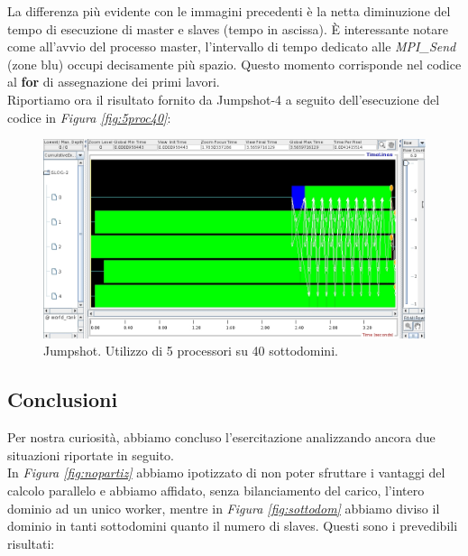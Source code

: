 
La differenza pi\`u evidente con le immagini precedenti \`e la netta diminuzione del tempo di esecuzione di master e slaves (tempo in ascissa).  \`E interessante notare come all'avvio del processo master, l'intervallo di tempo dedicato alle \emph{MPI\_Send} (zone blu) occupi decisamente pi\`u spazio. Questo momento corrisponde nel codice al \textbf{for} di assegnazione dei primi lavori.
\\
\newpage
Riportiamo ora il risultato fornito da Jumpshot-4 a seguito dell'esecuzione del codice in \emph{Figura \ref{fig:5proc40}}:

\begin{figure}[htbp]
\centering
\includegraphics[width=\textwidth]{Immagini_relazione/5_JS5p40.jpg}
\caption{Jumpshot. Utilizzo di 5 processori su 40 sottodomini.}
\label{}
\end{figure}

\newpage
\subsection*{Conclusioni}
Per nostra curiosit\`a, abbiamo concluso l'esercitazione analizzando ancora due situazioni riportate in seguito.
\\
In \emph{Figura \ref{fig:nopartiz}} abbiamo ipotizzato di non poter sfruttare i vantaggi del calcolo parallelo e abbiamo affidato, senza bilanciamento del carico, l'intero dominio ad un unico worker, mentre in \emph{Figura \ref{fig:sottodom}} abbiamo diviso il dominio in tanti sottodomini quanto il numero di slaves. Questi sono i prevedibili risultati:


